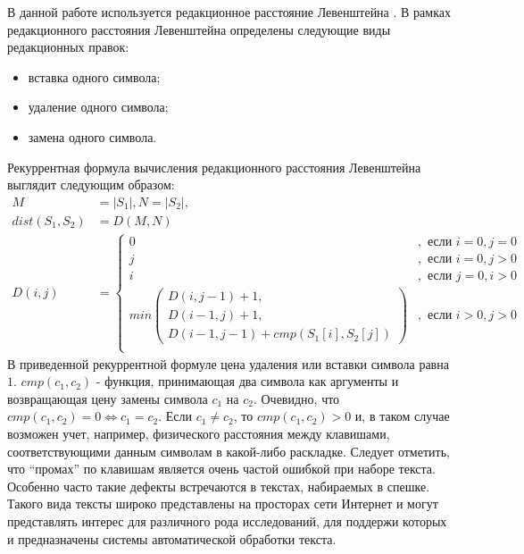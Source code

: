 В данной работе используется редакционное расстояние Левенштейна \cite{manning}. В рамках редакционного расстояния Левенштейна определены следующие виды редакционных правок:
\begin{itemize}
	\item
	вставка одного символа;
	\item
	удаление одного символа;
	\item
	замена одного символа.
\end{itemize}
Рекуррентная формула вычисления редакционного расстояния Левенштейна выглядит следующим образом:
\begin{align} 
	M &= |S_1|, N = |S_2|, \\
	dist(S_1, S_2) &= D(M, N) \\
	D(i, j) &= 
	\begin{cases}
		0&,\text{ если } i = 0, j = 0 \\
		j&,\text{ если } i = 0, j > 0 \\
		i&,\text{ если } j = 0, i > 0 \\
		min(\substack{
			D(i, j - 1) + 1, \\
			D(i - 1, j) + 1, \\
			D(i - 1, j - 1) + cmp(S_1[i], S_2[j])
		})&,\text{ если } i > 0, j > 0 \\  
	\end{cases}
\end{align}
В приведенной рекуррентной формуле цена удаления или вставки символа равна \(1\). \(cmp(c_1, c_2)\) - функция, принимающая два символа как аргументы и возвращающая цену замены символа \(c_1\) на \(c_2\). Очевидно, что \( cmp(c_1, c_2) = 0 \Leftrightarrow c_1 = c_2\). Если \(c_1 \neq c_2\), то \( cmp(c_1, c_2) > 0 \) и, в таком случае возможен учет, например, физического расстояния между клавишами, соответствующими данным символам в какой-либо раскладке. Следует отметить, что ``промах'' по клавишам является очень частой ошибкой при наборе текста. Особенно часто такие дефекты встречаются в текстах, набираемых в спешке. Такого вида тексты широко представлены на просторах сети Интернет и могут представлять интерес для различного рода исследований, для поддержи которых и предназначены системы автоматической обработки текста.

